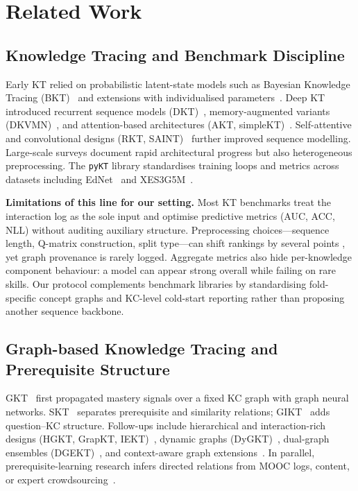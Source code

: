 \documentclass[runningheads]{llncs}
\newcommand{\KC}{knowledge component}
\begin{document}
\section{Related Work}
\label{sec:related}

\subsection{Knowledge Tracing and Benchmark Discipline}
\label{sec:related-kt}
Early KT relied on probabilistic latent-state models such as Bayesian
Knowledge Tracing (BKT)~\cite{corbett1995bkt} and extensions with
individualised parameters~\cite{yudelson2013pfa,khajah2016das3h}.
Deep KT introduced recurrent sequence models (DKT)~\cite{piech2015dkt},
memory-augmented variants (DKVMN)~\cite{zhang2017dkvmn}, and
attention-based architectures (AKT, simpleKT)~\cite{ghosh2020akt,
liu2023simplekt,chen2022dimkt,wang2023corekt}. Self-attentive and
convolutional designs (RKT, SAINT)~\cite{pandey2019rkt,shen2021saint}
further improved sequence modelling. Large-scale surveys
\cite{abdelrahman2023kt_survey} document rapid architectural progress
but also heterogeneous preprocessing. The \texttt{pyKT} library
\cite{liu2022pykt} standardises training loops and metrics across
datasets including EdNet~\cite{choi2020ednet} and
XES3G5M~\cite{xes3g5m2023}.

\textbf{Limitations of this line for our setting.}
Most KT benchmarks treat the interaction log as the sole input and
optimise predictive metrics (AUC, ACC, NLL) without auditing auxiliary
structure. Preprocessing choices---sequence length, Q-matrix
construction, split type---can shift rankings by several points
\cite{liu2022pykt,abdelrahman2023kt_survey}, yet graph provenance is
rarely logged. Aggregate metrics also hide per-\KC{} behaviour: a model
can appear strong overall while failing on rare skills. Our protocol
complements benchmark libraries by standardising fold-specific concept
graphs and KC-level cold-start reporting rather than proposing another
sequence backbone.

\subsection{Graph-based Knowledge Tracing and Prerequisite Structure}
\label{sec:related-graphkt}
GKT~\cite{nakagawa2019gkt} first propagated mastery signals over a
fixed KC graph with graph neural networks. SKT~\cite{tong2020skt}
separates prerequisite and similarity relations; GIKT~\cite{yang2021gikt}
adds question--KC structure. Follow-ups include hierarchical and
interaction-rich designs (HGKT, GrapKT, IEKT)~\cite{chen2023hgkt,
wang2022grapkt,liu2021iekt}, dynamic graphs (DyGKT)~\cite{dygkt2024},
dual-graph ensembles (DGEKT)~\cite{dgekt2024}, and context-aware graph
extensions~\cite{xiong2023gracekt,huang2022hawkt}. In parallel,
prerequisite-learning research infers directed relations from MOOC logs,
content, or expert crowdsourcing~\cite{lin2016moocprereq,pan2020concept,
chen2020dlprereq,laguna2018prereq,bai2025survey,chang2015junyi}.
\end{document}
